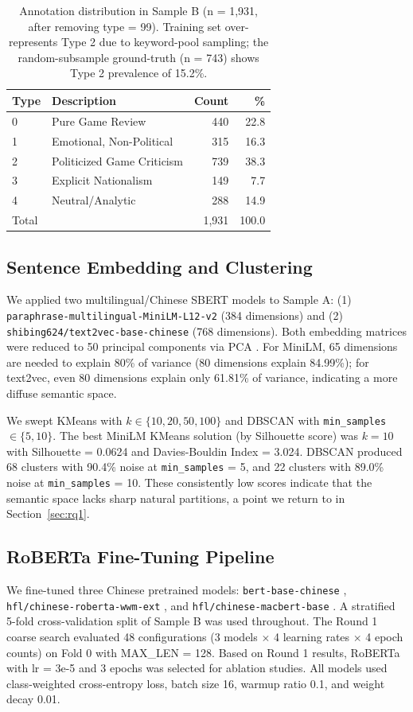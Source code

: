 \documentclass[letterpaper]{article}
\begin{document}
\begin{table}[t]
\centering
\caption{Annotation distribution in Sample B (n = 1,931, after removing type = 99). Training set over-represents Type 2 due to keyword-pool sampling; the random-subsample ground-truth (n = 743) shows Type 2 prevalence of 15.2\%.}
\label{tab:annotation}
\begin{tabular}{llrr}
\toprule
Type & Description & Count & \% \\
\midrule
0 & Pure Game Review & 440 & 22.8 \\
1 & Emotional, Non-Political & 315 & 16.3 \\
2 & Politicized Game Criticism & 739 & 38.3 \\
3 & Explicit Nationalism & 149 & 7.7 \\
4 & Neutral/Analytic & 288 & 14.9 \\
\midrule
Total & & 1,931 & 100.0 \\
\bottomrule
\end{tabular}
\end{table}

\subsection{Sentence Embedding and Clustering}
We applied two multilingual/Chinese SBERT models to Sample A: (1) \texttt{paraphrase-multilingual-MiniLM-L12-v2} (384 dimensions) and (2) \texttt{shibing624/text2vec-base-chinese} (768 dimensions). Both embedding matrices were reduced to 50 principal components via PCA \citep{lloyd1982kmeans}. For MiniLM, 65 dimensions are needed to explain 80\% of variance (80 dimensions explain 84.99\%); for text2vec, even 80 dimensions explain only 61.81\% of variance, indicating a more diffuse semantic space.

We swept KMeans \citep{lloyd1982kmeans} with $k \in \{10, 20, 50, 100\}$ and DBSCAN \citep{ester1996dbscan} with \texttt{min\_samples} $\in \{5, 10\}$. The best MiniLM KMeans solution (by Silhouette score) was $k = 10$ with Silhouette = 0.0624 and Davies-Bouldin Index = 3.024. DBSCAN produced 68 clusters with 90.4\% noise at \texttt{min\_samples} = 5, and 22 clusters with 89.0\% noise at \texttt{min\_samples} = 10. These consistently low scores indicate that the semantic space lacks sharp natural partitions, a point we return to in Section~\ref{sec:rq1}.

\subsection{RoBERTa Fine-Tuning Pipeline}
\label{sec:finetune}
We fine-tuned three Chinese pretrained models: \texttt{bert-base-chinese} \citep{devlin2019bert}, \texttt{hfl/chinese-roberta-wwm-ext} \citep{liu2019roberta, cui2020macbert}, and \texttt{hfl/chinese-macbert-base} \citep{cui2020macbert}. A stratified 5-fold cross-validation split of Sample B was used throughout. The Round 1 coarse search evaluated 48 configurations (3 models $\times$ 4 learning rates $\times$ 4 epoch counts) on Fold 0 with MAX\_LEN = 128. Based on Round 1 results, RoBERTa with lr = 3e-5 and 3 epochs was selected for ablation studies. All models used class-weighted cross-entropy loss, batch size 16, warmup ratio 0.1, and weight decay 0.01.
\end{document}
